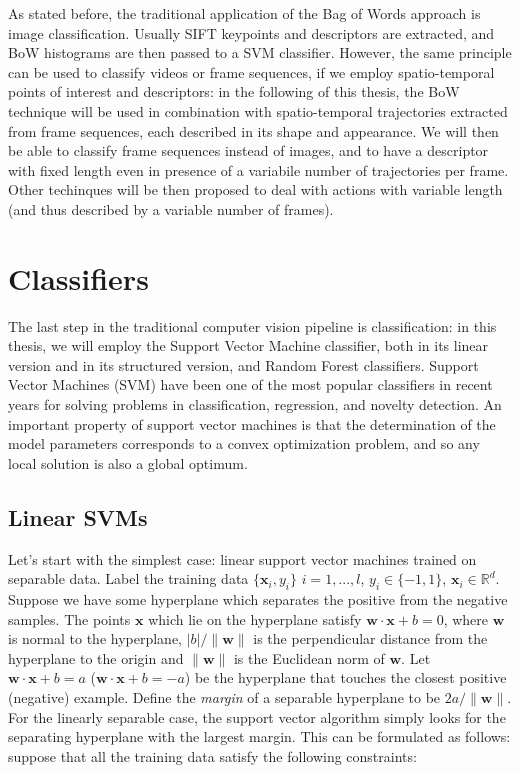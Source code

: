 As stated before, the traditional application of the Bag of Words approach is image classification. Usually SIFT keypoints and descriptors are extracted, and BoW histograms are then passed to a SVM classifier. However, the same principle can be used to classify videos or frame sequences, if we employ spatio-temporal points of interest and descriptors: in the following of this thesis, the BoW technique will be used in combination with spatio-temporal trajectories extracted from frame sequences, each described in its shape and appearance. We will then be able to classify frame sequences instead of images, and to have a descriptor with fixed length even in presence of a variabile number of trajectories per frame. Other techinques will be then proposed to deal with actions with variable length (and thus described by a variable number of frames).


\section{Classifiers}
The last step in the traditional computer vision pipeline is classification: in this thesis, we will employ the Support Vector Machine classifier, both in its linear version and in its structured version, and Random Forest classifiers. Support Vector Machines (SVM) have been one of the most popular classifiers in recent years for solving problems in classification, regression, and novelty detection. An important property of support vector machines is that the determination of the model parameters corresponds to a convex optimization problem, and so any local solution is also a global optimum.

\subsection{Linear SVMs}
Let's start with the simplest case: linear support vector machines trained on separable data. Label the training data $\{ \mathbf{x}_i, y_i\}$ $i=1, ..., l$, $y_i \in \{-1,1\}$, $\mathbf{x}_i \in \mathbb{R}^d$. Suppose we have some hyperplane which separates the positive from the negative samples. The points $\mathbf{x}$ which lie on the hyperplane satisfy $\mathbf{w} \cdot \mathbf{x} + b = 0$, where $\mathbf{w}$ is normal to the hyperplane, $|b|/\|\mathbf{w}\|$ is the perpendicular distance from the hyperplane to the origin and $\|\mathbf{w}\|$ is the Euclidean norm of $\mathbf{w}$. Let $\mathbf{w} \cdot \mathbf{x} +b = a$ ($\mathbf{w} \cdot \mathbf{x} +b = -a$) be the hyperplane that touches the closest positive (negative) example. Define the \textit{margin} of a separable hyperplane to be $2a / \| \mathbf{w} \|$. For the linearly separable case, the support vector algorithm simply looks for the separating hyperplane with the largest margin. This can be formulated as follows: suppose that all the training data satisfy the following constraints:

